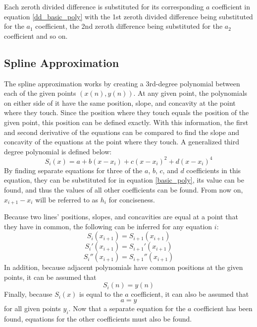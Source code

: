 \documentclass[12pt, letterpaper]{article} %
\begin{document}
Each zeroth divided difference is substituted for its corresponding $a$ coefficient in equation \ref{dd_basic_poly} with the 1st zeroth divided difference being substituted for the $a_1$ coefficient, the 2nd zeroth difference being substituted for the $a_2$ coefficient and so on.

\subsection{Spline Approximation}
The spline approximation works by creating a 3rd-degree polynomial between each of the given points \((x(n), y(n))\). At any given point, the polynomials on either side of it have the same position, slope, and concavity at the point where they touch. Since the position where they touch equals the position of the given point, this position can be defined exactly. With this information, the first and second derivative of the equations can be compared to find the slope and concavity of the equations at the point where they touch. A generalized third degree polynomial is defined below:
\begin{equation}
S_i(x) = a + b(x - x_i) + c(x - x_i)^2 + d(x - x_i)^4
\label{basic_poly}
\end{equation}
By finding separate equations for three of the $a$, $b$, $c$, and $d$ coefficients in this equation, they can be substituted for in equation \ref{basic_poly}, its value can be found, and thus the values of all other coefficients can be found.
From now on, \(x_{i + 1} - x_i\) will be referred to as \(h_i\) for conciseness.

Because two lines' positions, slopes, and concavities are equal at a point that they have in common, the following can be inferred for any equation \(i\):
\begin{equation}
S_i(x_{i+1}) = S_{i+1}(x_{i+1})
\label{0th_deriv}
\end{equation}
\begin{equation}
S_i'(x_{i+1}) = S_{i+1}'(x_{i+1})
\label{1st_deriv}
\end{equation}
\begin{equation}
S_i''(x_{i+1}) = S_{i+1}''(x_{i+1})
\label{2nd_deriv}
\end{equation}
In addition, because adjacent polynomials have common positions at the given points, it can be assumed that
\begin{equation}
S_i(n) = y(n)
\label{si.eq.y}
\end{equation}
Finally, because \(S_i(x)\) is equal to the \(a\) coefficient, it can also be assumed that
\begin{equation}
a = y
\label{a.eq.y}
\end{equation}
for all given points \(y_i\). Now that a separate equation for the $a$ coefficient has been found, equations for the other coefficients must also be found. 
\end{document}
